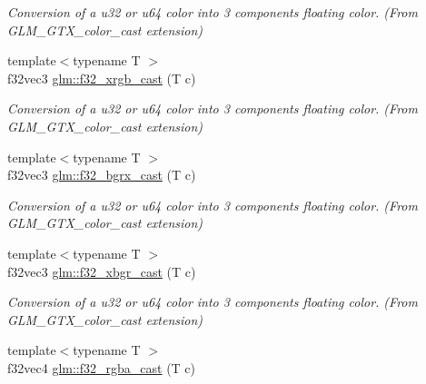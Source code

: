\begin{DoxyCompactItemize}
\begin{DoxyCompactList}\small\item\em Conversion of a u32 or u64 color into 3 components floating color. (From G\+L\+M\+\_\+\+G\+T\+X\+\_\+color\+\_\+cast extension) \end{DoxyCompactList}\item 
\hypertarget{group__gtx__color__cast_ga868c5082efaf50e0ca9824d9ff6b2ae6}{}{\footnotesize template$<$typename T $>$ }\\f32vec3 \hyperlink{group__gtx__color__cast_ga868c5082efaf50e0ca9824d9ff6b2ae6}{glm\+::f32\+\_\+xrgb\+\_\+cast} (T c)\label{group__gtx__color__cast_ga868c5082efaf50e0ca9824d9ff6b2ae6}

\begin{DoxyCompactList}\small\item\em Conversion of a u32 or u64 color into 3 components floating color. (From G\+L\+M\+\_\+\+G\+T\+X\+\_\+color\+\_\+cast extension) \end{DoxyCompactList}\item 
\hypertarget{group__gtx__color__cast_ga87f58ff1eff38f6f64d37917f7c3d605}{}{\footnotesize template$<$typename T $>$ }\\f32vec3 \hyperlink{group__gtx__color__cast_ga87f58ff1eff38f6f64d37917f7c3d605}{glm\+::f32\+\_\+bgrx\+\_\+cast} (T c)\label{group__gtx__color__cast_ga87f58ff1eff38f6f64d37917f7c3d605}

\begin{DoxyCompactList}\small\item\em Conversion of a u32 or u64 color into 3 components floating color. (From G\+L\+M\+\_\+\+G\+T\+X\+\_\+color\+\_\+cast extension) \end{DoxyCompactList}\item 
\hypertarget{group__gtx__color__cast_gac6c5ba434022dd3da2ca35d1a9314be2}{}{\footnotesize template$<$typename T $>$ }\\f32vec3 \hyperlink{group__gtx__color__cast_gac6c5ba434022dd3da2ca35d1a9314be2}{glm\+::f32\+\_\+xbgr\+\_\+cast} (T c)\label{group__gtx__color__cast_gac6c5ba434022dd3da2ca35d1a9314be2}

\begin{DoxyCompactList}\small\item\em Conversion of a u32 or u64 color into 3 components floating color. (From G\+L\+M\+\_\+\+G\+T\+X\+\_\+color\+\_\+cast extension) \end{DoxyCompactList}\item 
\hypertarget{group__gtx__color__cast_gade0903e79b1935818f3610169e784c28}{}{\footnotesize template$<$typename T $>$ }\\f32vec4 \hyperlink{group__gtx__color__cast_gade0903e79b1935818f3610169e784c28}{glm\+::f32\+\_\+rgba\+\_\+cast} (T c)\label{group__gtx__color__cast_gade0903e79b1935818f3610169e784c28}


\end{DoxyCompactItemize}
